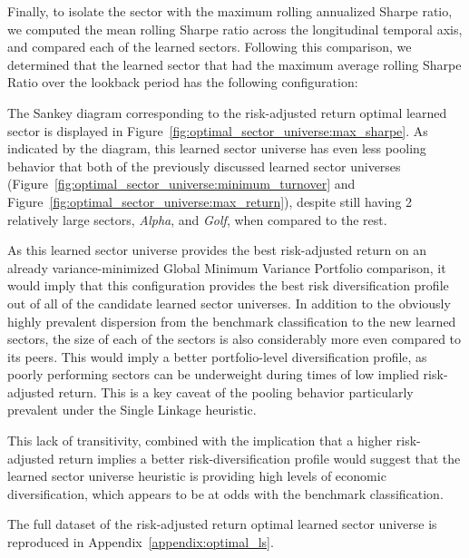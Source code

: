 \documentclass[../main.tex]{subfiles}
\begin{document}
Finally, to isolate the sector with the maximum rolling annualized Sharpe ratio, we computed the mean rolling Sharpe ratio across the longitudinal temporal axis, and compared each of the learned sectors. Following this comparison, we determined that the learned sector that had the maximum average rolling Sharpe Ratio over the lookback period has the following configuration:

\begin{minipage}{\linewidth}
    \centering
    \bfseries
\end{minipage}

\vspace{1em}

The Sankey diagram corresponding to the risk-adjusted return optimal learned sector is displayed in Figure~\ref{fig:optimal_sector_universe:max_sharpe}. As indicated by the diagram, this learned sector universe has even less pooling behavior that both of the previously discussed learned sector universes (Figure~\ref{fig:optimal_sector_universe:minimum_turnover} and Figure~\ref{fig:optimal_sector_universe:max_return}), despite still having 2 relatively large sectors, \textit{Alpha}, and \textit{Golf}, when compared to the rest.

As this learned sector universe provides the best risk-adjusted return on an already variance-minimized Global Minimum Variance Portfolio comparison, it would imply that this configuration provides the best risk diversification profile out of all of the candidate learned sector universes. In addition to the obviously highly prevalent dispersion from the benchmark classification to the new learned sectors, the size of each of the sectors is also considerably more even compared to its peers. This would imply a better portfolio-level diversification profile, as poorly performing sectors can be underweight during times of low implied risk-adjusted return. This is a key caveat of the pooling behavior particularly prevalent under the Single Linkage heuristic.

This lack of transitivity, combined with the implication that a higher risk-adjusted return implies a better risk-diversification profile would suggest that the learned sector universe heuristic is providing high levels of economic diversification, which appears to be at odds with the benchmark classification.

The full dataset of the risk-adjusted return optimal learned sector universe is reproduced in Appendix~\ref{appendix:optimal_ls}.
\end{document}

